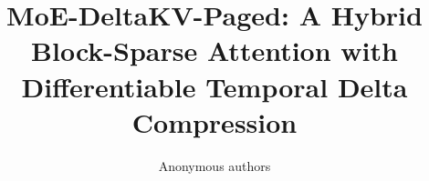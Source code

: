 \title{\textbf{MoE-DeltaKV-Paged: A Hybrid Block-Sparse Attention with Differentiable Temporal Delta Compression}}

\author{Anonymous authors}
